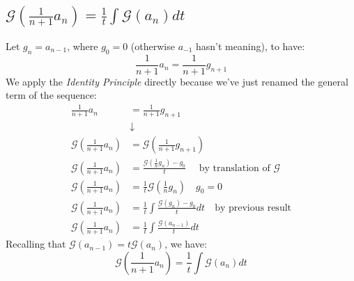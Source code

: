 \subsection{$\mathcal{G} ( \frac{1}{n+1} a_n) = \frac{1}{t} \int{
    \mathcal{G} (a_n)dt }$}

Let $g_n = a_{n-1}$, where $g_0 = 0$ (otherwise $a_{-1}$ hasn't
meaning), to have:
\begin{displaymath}
  \frac{1}{n+1} a_n = \frac{1}{n+1} g_{n+1}
\end{displaymath}
We apply the \emph{Identity Principle} directly because
we've just renamed the general term of the sequence:
\begin{displaymath}
  \begin{split}
    \frac{1}{n+1} a_n &= \frac{1}{n+1} g_{n+1} \\
    &\downarrow\\
    \mathcal{G} (\frac{1}{n+1} a_n) &= \mathcal{G} (\frac{1}{n+1}
    g_{n+1}) \\
    \mathcal{G} (\frac{1}{n+1} a_n) &= \frac{ \mathcal{G} (\frac{1}{n}
      g_n)-g_0}{t} \quad \text{ by translation of
    }\mathcal{G} \\
    \mathcal{G} (\frac{1}{n+1} a_n) &= \frac{1}{t} \mathcal{G}
    (\frac{1}{n} g_n)    \quad g_0 = 0\\
    \mathcal{G} (\frac{1}{n+1} a_n) &= \frac{1}{t} \int{
      \frac{\mathcal{G} (g_n) - g_0}{t}dt } \quad \text{by previous
      result}\\
    \mathcal{G} (\frac{1}{n+1} a_n) &= \frac{1}{t} \int{
      \frac{\mathcal{G} (a_{n-1})}{t}dt }
  \end{split}
\end{displaymath}
Recalling that $\mathcal{G} (a_{n-1}) = t \mathcal{G} (a_n)$, we have:
\begin{equation}
  \label{eq:n-plus-one-a-n-gen-fun}
  \mathcal{G} (\frac{1}{n+1} a_n) = \frac{1}{t} \int{ \mathcal{G}
    (a_{n})dt }
\end{equation}
